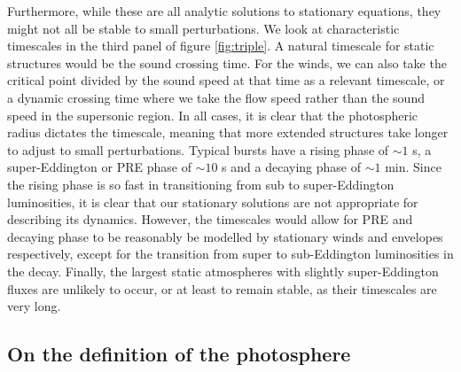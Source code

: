 \documentclass[../main.tex]{subfiles}
\begin{document}
Furthermore, while these are all analytic solutions to stationary equations, they might not all be stable to small perturbations.  We look at characteristic timescales in the third panel of figure \ref{fig:triple}.  A natural timescale for static structures would be the sound crossing time.  For the winds, we can also take the critical point divided by the sound speed at that time as a relevant timescale, or a dynamic crossing time where we take the flow speed rather than the sound speed in the supersonic region.  In all cases, it is clear that the photospheric radius dictates the timescale, meaning that more extended structures take longer to adjust to small perturbations.  Typical bursts have a rising phase of $\sim1$ s, a super-Eddington or PRE phase of $\sim10$ s and a decaying phase of $\sim1$ min.  Since the rising phase is so fast in transitioning from sub to super-Eddington luminosities, it is clear that our stationary solutions are not appropriate for describing its dynamics.  However, the timescales would allow for PRE and decaying phase to be reasonably be modelled by stationary winds and envelopes respectively, except for the transition from super to sub-Eddington luminosities in the decay.  Finally, the largest static atmospheres with slightly super-Eddington fluxes are unlikely to occur, or at least to remain stable, as their timescales are very long.

\subsection{On the definition of the photosphere}

\biblio
\end{document}
